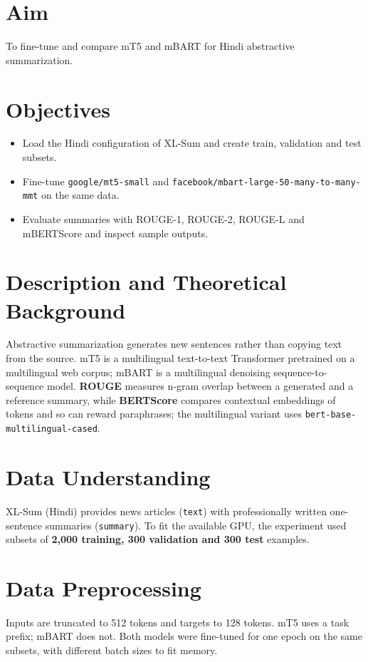 \documentclass[12pt,a4paper,oneside]{report}
\begin{document}
\section{Aim}
To fine-tune and compare mT5 and mBART for Hindi abstractive summarization.


\section{Objectives}
\begin{itemize}
\item Load the Hindi configuration of XL-Sum and create train, validation and test subsets.
\item Fine-tune \texttt{google/mt5-small} and \texttt{facebook/mbart-large-50-many-to-many-mmt} on the same data.
\item Evaluate summaries with ROUGE-1, ROUGE-2, ROUGE-L and mBERTScore and inspect sample outputs.
\end{itemize}

\section{Description and Theoretical Background}
Abstractive summarization generates new sentences rather than copying text from the source. mT5 is a multilingual text-to-text Transformer pretrained on a multilingual web corpus; mBART is a multilingual denoising sequence-to-sequence model. \textbf{ROUGE} measures n-gram overlap between a generated and a reference summary, while \textbf{BERTScore} compares contextual embeddings of tokens and so can reward paraphrases; the multilingual variant uses \texttt{bert-base-multilingual-cased}.


\section{Data Understanding}
XL-Sum (Hindi) provides news articles (\texttt{text}) with professionally written one-sentence summaries (\texttt{summary}). To fit the available GPU, the experiment used subsets of \textbf{2,000 training, 300 validation and 300 test} examples.


\section{Data Preprocessing}
Inputs are truncated to 512 tokens and targets to 128 tokens. mT5 uses a task prefix; mBART does not. Both models were fine-tuned for one epoch on the same subsets, with different batch sizes to fit memory.
\end{document}
